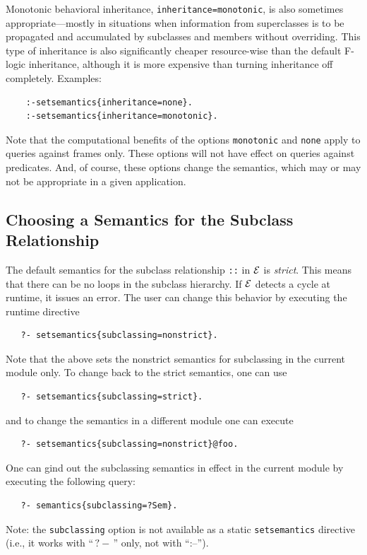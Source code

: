 \documentclass[11pt]{article}
\newcommand{\ERGO}{\mbox{\ensuremath{\cal{E}}\smaller{{\sc{RGO}}}}\xspace}
\newcommand{\FLSYSTEM}{\ERGO}
\newcommand{\query}{\mbox{$\, ?\! - \, $}}                  %
\newcommand{\fl}{\mbox{F-logic}\xspace}
\begin{document}
Monotonic behavioral inheritance, \texttt{inheritance=monotonic}, is also sometimes
appropriate---mostly in situations when information from superclasses is to
be propagated and accumulated by subclasses and members without overriding.
This type of inheritance is also significantly cheaper resource-wise than
the default \fl inheritance, although it is more expensive than turning inheritance
off completely.
Examples:
\begin{verbatim}
    :-setsemantics{inheritance=none}.
    :-setsemantics{inheritance=monotonic}.
\end{verbatim}
Note that the computational benefits of the options \texttt{monotonic} and 
\texttt{none} apply to queries against frames only.
These options will not have effect on queries against predicates.
And, of course, these options change the semantics, which may or may not be
appropriate in a given application.


\subsection{Choosing a Semantics for the Subclass Relationship}

The default semantics for the subclass relationship \texttt{::} in
\FLSYSTEM is \emph{strict}. This means that there can be no loops in the
subclass hierarchy. If \FLSYSTEM detects a cycle at runtime, it issues an
error.  The user can change this behavior by executing the runtime directive
\begin{verbatim}
   ?- setsemantics{subclassing=nonstrict}.
\end{verbatim}
Note that the above sets the nonstrict semantics for subclassing in the
current module only. To change back to the strict semantics, one can use
\begin{verbatim}
   ?- setsemantics{subclassing=strict}.
\end{verbatim}
and to change the semantics in a different module one can execute
\begin{verbatim}
   ?- setsemantics{subclassing=nonstrict}@foo.
\end{verbatim}

One can gind out the subclassing semantics in effect in the current module
by executing the following query:
\begin{verbatim}
   ?- semantics{subclassing=?Sem}.
\end{verbatim}
Note: the \texttt{subclassing} option is not available as a static
\texttt{setsemantics} directive (i.e., it works with ``$\query$'' only,
not with ``:--'').
\end{document}
